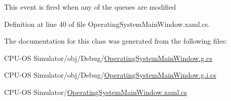 This event is fired when any of the queues are modified 



Definition at line 40 of file Operating\+System\+Main\+Window.\+xaml.\+cs.



The documentation for this class was generated from the following files\+:\begin{DoxyCompactItemize}
\item 
C\+P\+U-\/\+O\+S Simulator/obj/\+Debug/\hyperlink{_operating_system_main_window_8g_8cs}{Operating\+System\+Main\+Window.\+g.\+cs}\item 
C\+P\+U-\/\+O\+S Simulator/obj/\+Debug/\hyperlink{_operating_system_main_window_8g_8i_8cs}{Operating\+System\+Main\+Window.\+g.\+i.\+cs}\item 
C\+P\+U-\/\+O\+S Simulator/\hyperlink{_operating_system_main_window_8xaml_8cs}{Operating\+System\+Main\+Window.\+xaml.\+cs}\end{DoxyCompactItemize}
